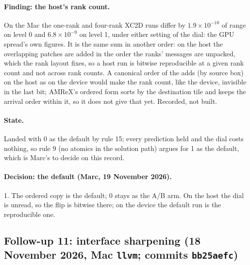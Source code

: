 \documentclass[11pt,a4paper]{article}
\newcommand{\code}[1]{\texttt{\small #1}}
\begin{document}
\paragraph{Finding: the host's rank count.}  On the Mac the one-rank
and four-rank XC2D runs differ by $1.9\times10^{-10}$ of range on level
0 and $6.8\times10^{-9}$ on level 1, under either setting of the dial:
the GPU spread's own figures.  It is the same sum in another order: on
the host the overlapping patches are added in the order the ranks'
messages are unpacked, which the rank layout fixes, so a host run is
bitwise reproducible at a given rank count and not across rank counts.
A canonical order of the adds (by source box) on the host as on the
device would make the rank count, like the device, invisible in the
last bit; AMReX's ordered form sorts by the destination tile and keeps
the arrival order within it, so it does not give that yet.  Recorded,
not built.

\paragraph{State.}  Landed with 0 as the default by rule 15; every
prediction held and the dial costs nothing, so rule 9 (no atomics in the
solution path) argues for 1 as the default, which is Marc's to decide on
this record.

\paragraph{Decision: the default (Marc, 19 November 2026).}  1.  The
ordered copy is the default; 0 stays as the A/B arm.  On the host the
dial is unread, so the flip is bitwise there; on the device the default
run is the reproducible one.


\subsection{Follow-up 11: interface sharpening (18 November 2026, Mac \code{llvm}; commits \code{bb25aefc})}
\label{sec:fu11}
\end{document}
